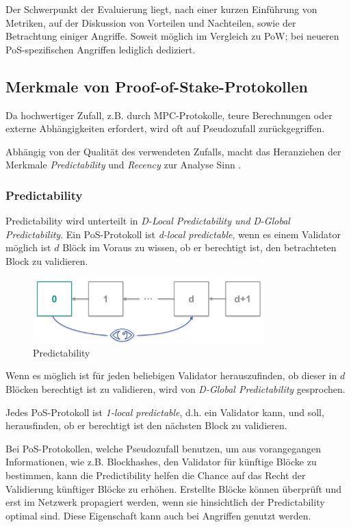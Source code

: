 Der Schwerpunkt der Evaluierung liegt, nach einer kurzen Einführung von Metriken, auf der Diskussion von Vorteilen und Nachteilen, sowie der Betrachtung einiger Angriffe. Soweit möglich im Vergleich zu PoW; bei neueren PoS-spezifischen Angriffen lediglich dediziert.

\subsection{Merkmale von Proof-of-Stake-Protokollen}

Da hochwertiger Zufall, z.B. durch MPC-Protokolle, teure Berechnungen oder externe Abhängigkeiten erfordert, wird oft auf Pseudozufall zurückgegriffen.

Abhängig von der Qualität des verwendeten Zufalls, macht das Heranziehen der Merkmale \textit{Predictability} und \textit{Recency} zur Analyse Sinn \cite{pos_talk}.

\subsubsection{Predictability}
\label{subsec:predictabilit}

Predictability wird unterteilt in \textit{D-Local Predictability und} \textit{D-Global Predictability}. Ein PoS-Protokoll ist \textit{d-local predictable}, wenn es einem Validator möglich ist $d$ Blöck im Voraus zu wissen, ob er berechtigt ist, den betrachteten Block zu validieren. 

\begin{figure}[htb] 
	\centerline{\includegraphics*[width=0.8\textwidth]{img/predictability}}
\caption{Predictability}
\label{fig:predictability}
\end{figure}

Wenn es möglich ist für jeden beliebigen Validator herauszufinden, ob dieser in $d$ Blöcken berechtigt ist zu validieren, wird von \textit{D-Global Predictability} gesprochen.

Jedes PoS-Protokoll ist \textit{1-local predictable}, d.h. ein Validator kann, und soll, herausfinden, ob er berechtigt ist den nächsten Block zu validieren.

Bei PoS-Protokollen, welche Pseudozufall benutzen, um aus vorangegangen Informationen, wie z.B. Blockhashes, den Validator für künftige Blöcke zu bestimmen, kann die Predictibility helfen die Chance auf das Recht der Validierung künftiger Blöcke zu erhöhen. 
Erstellte Blöcke können überprüft und erst im Netzwerk propagiert werden, wenn sie hinsichtlich der Predictability optimal sind. Diese Eigenschaft kann auch bei Angriffen genutzt werden.

